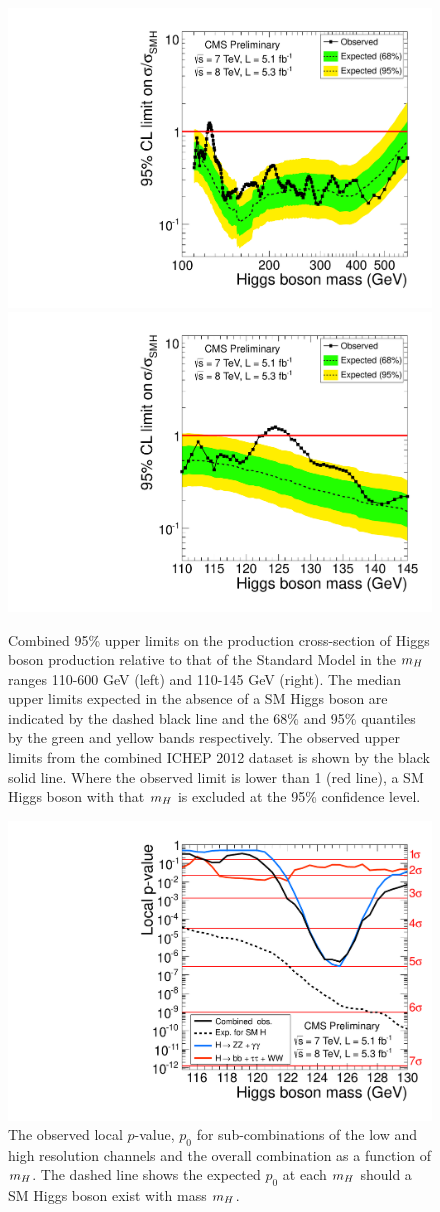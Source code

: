 \begin{figure}
\begin{center}
 \includegraphics[width=.49\textwidth]{combinations/ichep2012/Figure_004-a.pdf}
 \includegraphics[width=.49\textwidth]{combinations/ichep2012/Figure_004-b.pdf}
 \caption{Combined 95\% upper limits on the production cross-section of Higgs boson
production relative to that of the Standard Model in the $m_{H}$ ranges 110-600 GeV (left)
and 110-145 GeV (right). The median upper limits expected in the absence of a SM Higgs boson  
are indicated by the dashed black line and the 68\% and 95\% quantiles by the green and yellow
bands respectively.
The observed upper limits from the combined ICHEP 2012 dataset is shown by the black solid line.
Where the observed limit is lower than 1 (red line), a SM Higgs boson with that $m_{H}$ 
is excluded at the 95\% confidence level.}
\end{center}
\label{fig:combinedexcl}
\end{figure}

\begin{figure}
\begin{center}
\includegraphics[width=.8\textwidth]{combinations/ichep2012/sqr_pvala_all_byresol.pdf}
\caption{The observed local $p$-value, $p_{0}$ for sub-combinations of the low and
high resolution channels and the overall combination as a function of $m_{H}$. The dashed
line shows the expected $p_{0}$ at each $m_{H}$ should a SM Higgs boson exist with mass $m_{H}$.}
\end{center}
\label{fig:combinedpval}
\end{figure}


